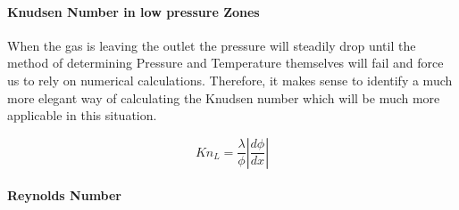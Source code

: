 \paragraph{Knudsen Number in low pressure Zones}
When the gas is leaving the outlet the pressure will steadily drop until the method of determining Pressure and Temperature themselves will fail and force us to rely on numerical calculations. Therefore, it makes sense to identify a much more elegant way of calculating the Knudsen number which will be much more applicable in this situation.

$$
K n_L = \frac{\lambda}{\phi} \left| \frac{d\phi}{dx} \right|
$$

\newpage

\paragraph{Reynolds Number}

